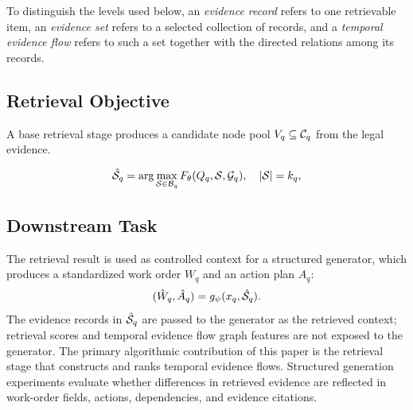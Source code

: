 To distinguish the levels used below, an \emph{evidence record} refers to one retrievable item, an \emph{evidence set} refers to a selected collection of records, and a \emph{temporal evidence flow} refers to such a set together with the directed relations among its records.

\subsection{Retrieval Objective}

A base retrieval stage produces a candidate node pool \(V_q\subseteq\mathcal{C}_q\) from the legal evidence. 

\begin{equation}
\hat{\mathcal{S}}_q
=
\arg\max_{\mathcal{S}\in\mathcal{B}_q}
F_{\theta}(Q_q,\mathcal{S},\mathcal{G}_q),
\quad |\mathcal{S}|=k_q,
\label{eq:set_selection}
\end{equation}

\subsection{Downstream Task}

The retrieval result is used as controlled context for a structured generator, which produces a standardized work order $W_q$ and an action plan $A_q$:
\begin{equation}
(\hat W_q,\hat A_q)=g_{\psi}(x_q,\hat{\mathcal{S}}_q).
\label{eq:downstream_generation}
\end{equation}
The evidence records in $\hat{\mathcal{S}}_q$ are passed to the generator as the retrieved context; retrieval scores and temporal evidence flow graph features are not exposed to the generator. The primary algorithmic contribution of this paper is the retrieval stage that constructs and ranks temporal evidence flows. Structured generation experiments evaluate whether differences in retrieved evidence are reflected in work-order fields, actions, dependencies, and evidence citations.


